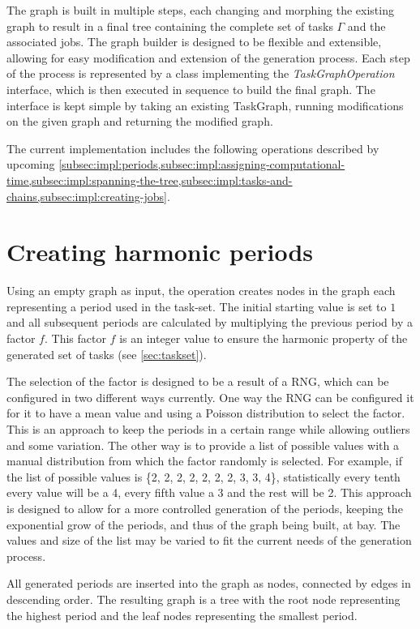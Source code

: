 The graph is built in multiple steps, each changing and morphing the existing graph to result in a final tree containing the complete set of tasks $\Gamma$ and the associated jobs.
The graph builder is designed to be flexible and extensible, allowing for easy modification and extension of the generation process.
Each step of the process is represented by a class implementing the \textit{TaskGraphOperation} interface, which is then executed in sequence to build the final graph.
The interface is kept simple by taking an existing TaskGraph, running modifications on the given graph and returning the modified graph.

The current implementation includes the following operations described by upcoming \cref{subsec:impl:periods,subsec:impl:assigning-computational-time,subsec:impl:spanning-the-tree,subsec:impl:tasks-and-chains,subsec:impl:creating-jobs}.

\section{Creating harmonic periods}\label{subsec:impl:periods}
Using an empty graph as input, the operation creates nodes in the graph each representing a period used in the task-set.
The initial starting value is set to $1$ and all subsequent periods are calculated by multiplying the previous period by a factor $f$.
This factor $f$ is an integer value to ensure the harmonic property of the generated set of tasks (see \cref{sec:taskset}).

The selection of the factor is designed to be a result of a \ac{RNG}, which can be configured in two different ways currently.
One way the \ac{RNG} can be configured it for it to have a mean value and using a Poisson distribution to select the factor.
This is an approach to keep the periods in a certain range while allowing outliers and some variation.
The other way is to provide a list of possible values with a manual distribution from which the factor randomly is selected.
For example, if the list of possible values is \{2, 2, 2, 2, 2, 2, 2, 3, 3, 4\}, statistically every tenth every value will be a 4, every fifth value a 3 and the rest will be 2.
This approach is designed to allow for a more controlled generation of the periods, keeping the exponential grow of the periods, and thus of the graph being built, at bay.
The values and size of the list may be varied to fit the current needs of the generation process.

All generated periods are inserted into the graph as nodes, connected by edges in descending order.
The resulting graph is a tree with the root node representing the highest period and the leaf nodes representing the smallest period.

